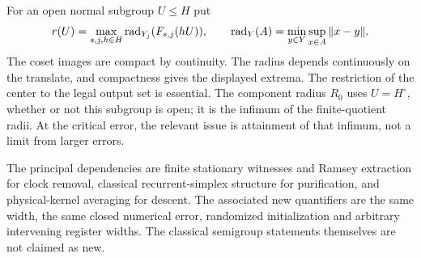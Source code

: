For an open normal subgroup $U\le H$ put
\begin{equation}\label{eq:quotientradius55}
 r(U)=\max_{s,j,h\in H}\operatorname{rad}_{Y_j}(F_{s,j}(hU)),
 \qquad\operatorname{rad}_Y(A)=\min_{y\in Y}\sup_{x\in A}\|x-y\|.
\end{equation}
The coset images are compact by continuity. The radius depends continuously on the translate, and compactness gives the displayed extrema. The restriction of the center to the legal output set is essential. The component radius $R_0$ uses $U=H^\circ$, whether or not this subgroup is open; it is the infimum of the finite-quotient radii. At the critical error, the relevant issue is attainment of that infimum, not a limit from larger errors.


The principal dependencies are finite stationary witnesses and Ramsey
extraction for clock removal, classical recurrent-simplex structure for
purification, and physical-kernel averaging for descent. The associated
new quantifiers are the same width, the same closed numerical error,
randomized initialization and arbitrary intervening register widths.
The classical semigroup statements themselves are not claimed as new.
